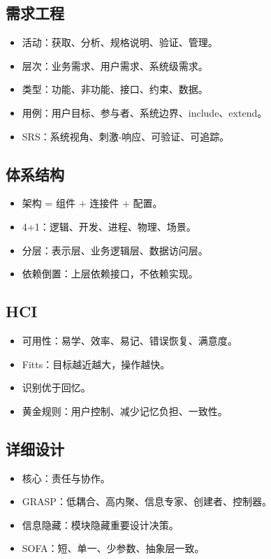 \documentclass[UTF8,zihao=-4]{ctexart}
\begin{document}
\subsection{需求工程}

\begin{itemize}
\item 活动：获取、分析、规格说明、验证、管理。
\item 层次：业务需求、用户需求、系统级需求。
\item 类型：功能、非功能、接口、约束、数据。
\item 用例：用户目标、参与者、系统边界、include、extend。
\item SRS：系统视角、刺激-响应、可验证、可追踪。
\end{itemize}

\subsection{体系结构}

\begin{itemize}
\item 架构 = 组件 + 连接件 + 配置。
\item 4+1：逻辑、开发、进程、物理、场景。
\item 分层：表示层、业务逻辑层、数据访问层。
\item 依赖倒置：上层依赖接口，不依赖实现。
\end{itemize}

\subsection{HCI}

\begin{itemize}
\item 可用性：易学、效率、易记、错误恢复、满意度。
\item Fitts：目标越近越大，操作越快。
\item 识别优于回忆。
\item 黄金规则：用户控制、减少记忆负担、一致性。
\end{itemize}

\subsection{详细设计}

\begin{itemize}
\item 核心：责任与协作。
\item GRASP：低耦合、高内聚、信息专家、创建者、控制器。
\item 信息隐藏：模块隐藏重要设计决策。
\item SOFA：短、单一、少参数、抽象层一致。
\end{itemize}
\end{document}
